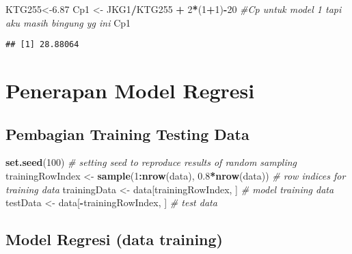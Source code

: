 \documentclass[
]{article}
\newenvironment{Shaded}{\begin{snugshade}}{\end{snugshade}}
\newcommand{\CommentTok}[1]{\textcolor[rgb]{0.56,0.35,0.01}{\textit{#1}}}
\newcommand{\DecValTok}[1]{\textcolor[rgb]{0.00,0.00,0.81}{#1}}
\newcommand{\FloatTok}[1]{\textcolor[rgb]{0.00,0.00,0.81}{#1}}
\newcommand{\FunctionTok}[1]{\textcolor[rgb]{0.13,0.29,0.53}{\textbf{#1}}}
\newcommand{\NormalTok}[1]{#1}
\newcommand{\OtherTok}[1]{\textcolor[rgb]{0.56,0.35,0.01}{#1}}
\newcommand{\SpecialCharTok}[1]{\textcolor[rgb]{0.81,0.36,0.00}{\textbf{#1}}}
\begin{document}
\begin{Shaded}
\begin{Highlighting}[]
\NormalTok{KTG255}\OtherTok{\textless{}{-}}\FloatTok{6.87}
\NormalTok{Cp1 }\OtherTok{\textless{}{-}}\NormalTok{ JKG1}\SpecialCharTok{/}\NormalTok{KTG255 }\SpecialCharTok{+} \DecValTok{2}\SpecialCharTok{*}\NormalTok{(}\DecValTok{1}\SpecialCharTok{+}\DecValTok{1}\NormalTok{)}\SpecialCharTok{{-}}\DecValTok{20} \CommentTok{\#Cp untuk model 1 tapi aku masih bingung yg ini}
\NormalTok{Cp1}
\end{Highlighting}
\end{Shaded}

\begin{verbatim}
## [1] 28.88064
\end{verbatim}

\section{Penerapan Model Regresi}\label{penerapan-model-regresi}

\subsection{Pembagian Training Testing
Data}\label{pembagian-training-testing-data}

\begin{Shaded}
\begin{Highlighting}[]
\FunctionTok{set.seed}\NormalTok{(}\DecValTok{100}\NormalTok{) }\CommentTok{\# setting seed to reproduce results of random sampling}
\NormalTok{trainingRowIndex }\OtherTok{\textless{}{-}} \FunctionTok{sample}\NormalTok{(}\DecValTok{1}\SpecialCharTok{:}\FunctionTok{nrow}\NormalTok{(data), }\FloatTok{0.8}\SpecialCharTok{*}\FunctionTok{nrow}\NormalTok{(data)) }\CommentTok{\# row indices for training data}
\NormalTok{trainingData }\OtherTok{\textless{}{-}}\NormalTok{ data[trainingRowIndex, ] }\CommentTok{\# model training data}
\NormalTok{testData }\OtherTok{\textless{}{-}}\NormalTok{ data[}\SpecialCharTok{{-}}\NormalTok{trainingRowIndex, ] }\CommentTok{\# test data}
\end{Highlighting}
\end{Shaded}

\subsection{Model Regresi (data
training)}\label{model-regresi-data-training}
\end{document}
